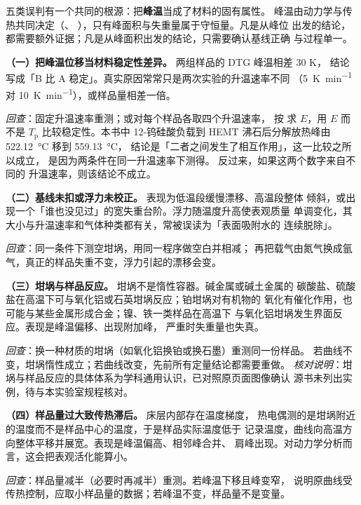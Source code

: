 \begin{principle}
五类误判有一个共同的根源：把\textbf{峰温}当成了材料的固有属性。
峰温由动力学与传热共同决定（、
），只有峰面积与失重量属于守恒量。凡是从峰位
出发的结论，都需要额外证据；凡是从峰面积出发的结论，只需要确认基线正确
与过程单一。
\end{principle}

\begin{pitfall}
\textbf{（一）把峰温位移当材料稳定性差异。} 两组样品的 DTG 峰温相差 30 K，
结论写成「B 比 A 稳定」。真实原因常常只是两次实验的升温速率不同
（\qty{5}{K.min^{-1}} 对 \qty{10}{K.min^{-1}}），或样品量相差一倍。

\emph{回查}：固定升温速率重测；或对每个样品各取四个升温速率，
按 求 $E$，用 $E$ 而不是 $T_{\mathrm p}$
比较稳定性。本书中 12-钨硅酸负载到 HEMT 沸石后分解放热峰由
\qty{522.12}{\celsius} 移到 \qty{559.13}{\celsius}，
结论是「二者之间发生了相互作用」，这一比较之所以成立，
是因为两条件在同一升温速率下测得。 反过来，如果这两个数字来自不同的
升温速率，则该结论不成立。

\textbf{（二）基线未扣或浮力未校正。} 表现为低温段缓慢漂移、高温段整体
倾斜，或出现一个「谁也没见过」的宽失重台阶。浮力随温度升高使表观质量
单调变化，其大小与升温速率和气体种类都有关，常被误读为「表面吸附水的
连续脱除」。

\emph{回查}：同一条件下测空坩埚，用同一程序做空白并相减；
再把载气由氮气换成氩气，真正的样品失重不变，浮力引起的漂移会变。

\textbf{（三）坩埚与样品反应。} 坩埚不是惰性容器。碱金属或碱土金属的
碳酸盐、硫酸盐在高温下可与氧化铝或石英坩埚反应；铂坩埚对有机物的
氧化有催化作用，也可能与某些金属形成合金；镍、铁一类样品在高温下
与氧化铝坩埚发生界面反应。表现是峰温偏移、出现附加峰，
严重时失重量也失真。

\emph{回查}：换一种材质的坩埚（如氧化铝换铂或换石墨）重测同一份样品。
若曲线不变，坩埚惰性成立；若曲线改变，先前所有定量结论都需要重做。
\emph{核对说明}：坩埚与样品反应的具体体系为学科通用认识，已对照原页面图像确认
源书未列出实例，待与本实验室规程核对。

\textbf{（四）样品量过大致传热滞后。} 床层内部存在温度梯度，
热电偶测的是坩埚附近的温度而不是样品中心的温度，于是样品实际温度低于
记录温度，曲线向高温方向整体平移并展宽。表现是峰温偏高、相邻峰合并、
肩峰出现。对动力学分析而言，这会把表观活化能算小。

\emph{回查}：样品量减半（必要时再减半）重测。若峰温下移且峰变窄，
说明原曲线受传热控制，应取小样品量的数据；若峰温不变，样品量不是变量。


\end{pitfall}
